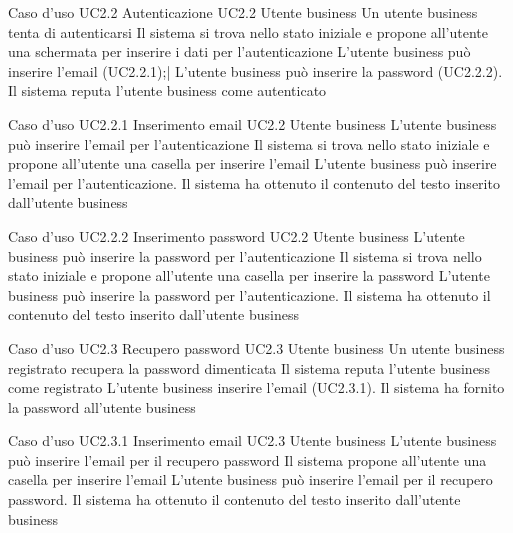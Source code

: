 \UCtitle
{Caso d'uso UC2.2}
{Autenticazione}
\UC
{UC2.2}
{Utente business}
{Un utente business tenta di autenticarsi}
{Il sistema si trova nello stato iniziale e propone all'utente una schermata per inserire i dati per l'autenticazione}
\scenario
{
L'utente business può inserire l'email (UC2.2.1);|
L'utente business può inserire la password (UC2.2.2).
}
\post
{Il sistema reputa l'utente business come autenticato}

\UCtitle
{Caso d'uso UC2.2.1}
{Inserimento email}
\UC
{UC2.2}
{Utente business}
{L'utente business può inserire l'email per l'autenticazione}
{Il sistema si trova nello stato iniziale e propone all'utente una casella per inserire l'email}
\scenario
{L'utente business può inserire l'email per l'autenticazione.}
\post
{Il sistema ha ottenuto il contenuto del testo inserito dall'utente business}

\UCtitle
{Caso d'uso UC2.2.2}
{Inserimento password}
\UC
{UC2.2}
{Utente business}
{L'utente business può inserire la password per l'autenticazione}
{Il sistema si trova nello stato iniziale e propone all'utente una casella per inserire la password}
\scenario
{L'utente business può inserire la password per l'autenticazione.}
\post
{Il sistema ha ottenuto il contenuto del testo inserito dall'utente business}

\UCtitle
{Caso d'uso UC2.3}
{Recupero password}
\UC
{UC2.3}
{Utente business}
{Un utente business registrato recupera la password dimenticata}
{Il sistema  reputa l'utente business come registrato}
\scenario
{L'utente business inserire l'email (UC2.3.1).
}
\post
{Il sistema ha fornito la password all'utente business}

\UCtitle
{Caso d'uso UC2.3.1}
{Inserimento email}
\UC
{UC2.3}
{Utente business}
{L'utente business può inserire l'email per il recupero password}
{Il sistema propone all'utente una casella per inserire l'email}
\scenario
{L'utente business può inserire l'email per il recupero password.}
\post
{Il sistema ha ottenuto il contenuto del testo inserito dall'utente business}


